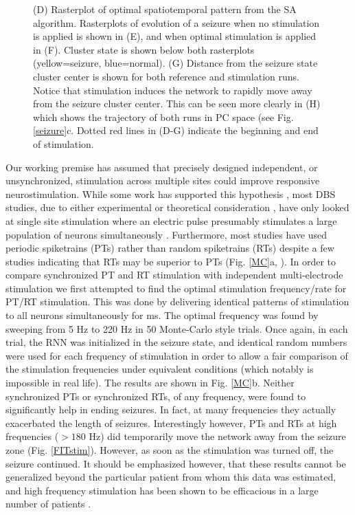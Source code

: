 \documentclass[11pt,a4paper,final]{article}
\begin{document}
\begin{figure}[!ht]
{		(D) Rasterplot of optimal spatiotemporal pattern from the SA algorithm.
		Rasterplots of evolution of a seizure when no stimulation is applied is shown in (E), and when optimal stimulation is applied in (F). Cluster state is shown below both rasterplots (yellow=seizure, blue=normal).
		(G) Distance from the seizure state cluster center is shown for both reference and stimulation runs. Notice that stimulation induces the network to rapidly move away from the seizure cluster center. This can be seen more clearly in (H) which shows the trajectory of both runs in PC space (see Fig. \ref{seizure}c.
		Dotted red lines in (D-G) indicate the beginning and end of stimulation.}
	\label{SAresults}
\end{figure}

Our working premise has assumed that precisely designed independent, or unsynchronized, stimulation across multiple sites could improve responsive neurostimulation.
While some work has supported this hypothesis \citep{nelson11}, most DBS studies, due to either experimental or theoretical consideration \citep{durand01}, have only looked at single site stimulation where an electric pulse presumably stimulates a large population of neurons simultaneously \citep{sun14}.
Furthermore, most studies have used periodic spiketrains (PTs) rather than random spiketrains (RTs) despite a few studies indicating that RTs may be superior to PTs (Fig. \ref{MC}a, \citet{wyckhuys10,van14}).
In order to compare synchronized PT and RT stimulation with independent multi-electrode stimulation we first attempted to find the optimal stimulation frequency/rate for PT/RT stimulation.
This was done by delivering identical patterns of stimulation to all \nn{} neurons simultaneously for \len{} ms.
The optimal frequency was found by sweeping from 5 Hz to 220 Hz in 50 Monte-Carlo style trials.
Once again, in each trial, the RNN was initialized in the seizure state, and identical random numbers were used for each frequency of stimulation in order to allow a fair comparison of the stimulation frequencies under equivalent conditions (which notably is impossible in real life).
The results are shown in Fig. \ref{MC}b.
Neither synchronized PTs or synchronized RTs, of any frequency, were found to significantly help in ending seizures.
In fact, at many frequencies they actually exacerbated the length of seizures.
Interestingly however, PTs and RTs at high frequencies ($>180$ Hz) did temporarily move the network away from the seizure zone (Fig. \ref{FITstim}).
However, as soon as the stimulation was turned off, the seizure continued.
It should be emphasized however, that these results cannot be generalized beyond the particular patient from whom this data was estimated, and high frequency stimulation has been shown to be efficacious in a large number of patients \citep{heck14}.
\end{document}
